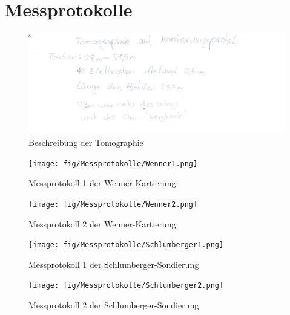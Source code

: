 \section{Messprotokolle}

\begin{figure}[ht]
\centering
\includegraphics[width=\textwidth]{fig/Messprotokolle/Tomographie.png}
\caption{Beschreibung der Tomographie}
\label{abb:AnhTomographie}
\end{figure}

\begin{figure}[ht]
\centering
\texttt{[image: fig/Messprotokolle/Wenner1.png]}
\caption{Messprotokoll 1 der Wenner-Kartierung}
\label{abb:Wenner1}
\end{figure}

\begin{figure}[ht]
\centering
\texttt{[image: fig/Messprotokolle/Wenner2.png]}
\caption{Messprotokoll 2 der Wenner-Kartierung}
\label{abb:Wenner2}
\end{figure}

\begin{figure}[ht]
\centering
\texttt{[image: fig/Messprotokolle/Schlumberger1.png]}
\caption{Messprotokoll 1 der Schlumberger-Sondierung}
\label{abb:Schlumberger1}
\end{figure}

\begin{figure}[ht]
\centering
\texttt{[image: fig/Messprotokolle/Schlumberger2.png]}
\caption{Messprotokoll 2 der Schlumberger-Sondierung}
\label{abb:Schlumberger2}
\end{figure}
